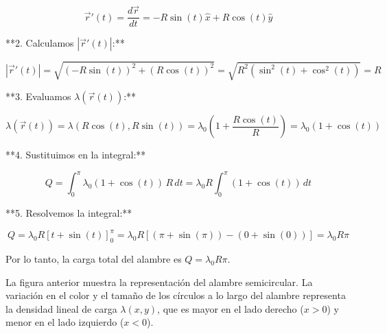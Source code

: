 \documentclass{article}
\begin{document}
\[
\vec{r}'(t) = \frac{d\vec{r}}{dt} = -R\sin(t)\hat{x} + R\cos(t)\hat{y}
\]

**2. Calculamos $|\vec{r}'(t)|$:**

\[
|\vec{r}'(t)| = \sqrt{(-R\sin(t))^2 + (R\cos(t))^2} = \sqrt{R^2(\sin^2(t) + \cos^2(t))} = R
\]

**3. Evaluamos $\lambda(\vec{r}(t))$:**

\[
\lambda(\vec{r}(t)) = \lambda(R\cos(t), R\sin(t)) = \lambda_0 \left(1 + \frac{R\cos(t)}{R}\right) = \lambda_0 (1 + \cos(t))
\]

**4. Sustituimos en la integral:**

\[
Q = \int_0^{\pi} \lambda_0 (1 + \cos(t)) \, R \, dt = \lambda_0 R \int_0^{\pi} (1 + \cos(t)) \, dt
\]

**5. Resolvemos la integral:**

\[
Q = \lambda_0 R [t + \sin(t)]_0^{\pi} = \lambda_0 R [(\pi + \sin(\pi)) - (0 + \sin(0))] = \lambda_0 R \pi
\]

Por lo tanto, la carga total del alambre es $Q = \lambda_0 R \pi$.

\begin{center}
\end{center}

La figura anterior muestra la representación del alambre semicircular. La variación en el color y el tamaño de los círculos a lo largo del alambre representa la densidad lineal de carga $\lambda(x, y)$, que es mayor en el lado derecho ($x > 0$) y menor en el lado izquierdo ($x < 0$).
\end{document}
